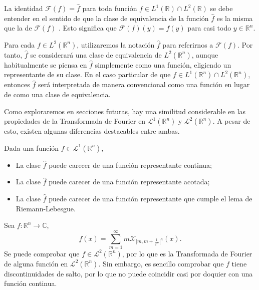 \begin{observacion}
La identidad \(\mathscr{F}(f) = \widehat{f}\) para toda función \(f \in L^1(\mathbb{R}) \cap L^2(\mathbb{R})\) se debe entender en el sentido de que la clase de equivalencia de la función \(\widehat{f}\) es la misma que la de \(\mathscr{F}(f)\) . Esto significa que \(\mathscr{F}(f)(y) = f(y)\) para casi todo \(y \in \mathbb{R}^n\).
\end{observacion}
 
 \begin{observacion}
\noindent Para cada \(f \in L^2(\mathbb{R}^n)\), utilizaremos la notación \(\widehat{f}\) para referirnos a \(\mathscr{F}(f)\). Por tanto, \(\widehat{f}\) se considerará  una clase de equivalencia de \(L^2(\mathbb{R}^n)\), aunque habitualmente se piensa en \(\widehat{f}\) simplemente como una función, eligiendo un representante de su clase. En el caso particular de que \(f \in L^1(\mathbb{R}^n) \cap L^2(\mathbb{R}^n)\), entonces \(\widehat{f}\) será interpretada de manera convencional como una función en lugar de como una clase de equivalencia.

\end{observacion}

\noindent Como exploraremos en secciones futuras, hay una similitud considerable en las propiedades de la Transformada de Fourier en $\mathscr{L}^1(\mathbb{R}^n)$ y $\mathscr{L}^2(\mathbb{R}^n)$. A pesar de esto, existen algunas diferencias destacables entre ambas.

\noindent Dada una función $f \in \mathscr{L}^1(\mathbb{R}^n)$,
\begin{itemize}
    \item La clase $\widehat{f}$ puede carecer de una función representante continua;
    \item La clase $\widehat{f}$ puede carecer de una función representante acotada;
    \item La clase $\widehat{f}$ puede carecer de una función representante que cumple el lema de Riemann-Lebesgue.
\end{itemize}
\begin{ejemplo}
Sea $f: \mathbb{R}^n \rightarrow \mathbb{C}$,
\begin{equation}
    f(x) = \sum_{m=1}^{\infty}m\mathcal{X}_{]m,m+\frac{1}{2^m}[^n }(x).
\end{equation}
Se puede comprobar que $f \in \mathscr{L}^2(\mathbb{R}^n)$, por lo que es la Transformada de Fourier de alguna función en $\mathscr{L}^2(\mathbb{R}^n)$. Sin embargo, es sencillo comprobar que $f$ tiene discontinuidades de salto, por lo que no puede coincidir casi por doquier con una función continua.
\end{ejemplo}


